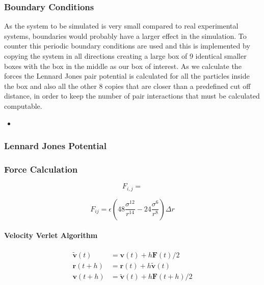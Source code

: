 \documentclass[
10pt, %
a4paper, %
oneside, %
headinclude,footinclude, %
BCOR5mm, %
]{scrartcl}
\newcommand{\insertcode}[2]{\begin{itemize}\item[]\end{itemize}} %
\begin{document}
\subsubsection{Boundary Conditions}
As the system to be simulated is very small compared to real experimental systems, boundaries would probably have a larger effect in the simulation. To counter this periodic boundary conditions are used and this is implemented by copying the system in all directions creating a large box of 9 identical smaller boxes with the box in the middle as our box of interest. As we calculate the forces the Lennard Jones pair potential is calculated for all the particles inside the box and also all the other 8 copies that are closer than a predefined cut off distance, in order to keep the number of pair interactions that must be calculated computable. 

\insertcode{"Scripts/boundary_conditions_snippet_1.f90"}{Creating periodic boundary conditions} %





\subsubsection{Lennard Jones Potential}

 
\subsubsection{Force Calculation}

\begin{equation}
F_{i,j} = 
\end{equation}

$$ F_{ij} = \epsilon \left ( 48 \frac{\sigma^{12}}{r^{14}} - 24 \frac{\sigma^6}{r^8} \right ) \Delta r $$

\paragraph{Velocity Verlet Algorithm}

\begin{align}
\tilde{\mathbf{v}}(t) &=  \mathbf{v}(t) + h \mathbf{F}(t)/2 \\
\mathbf{r}(t+h) &= \mathbf{r}(t) + h\tilde{\mathbf{v}}(t) \\
\mathbf{v}(t+h) &= \tilde{\mathbf{v}}(t) + h \mathbf{F}(t+h)/2 
\end{align}
\end{document}
